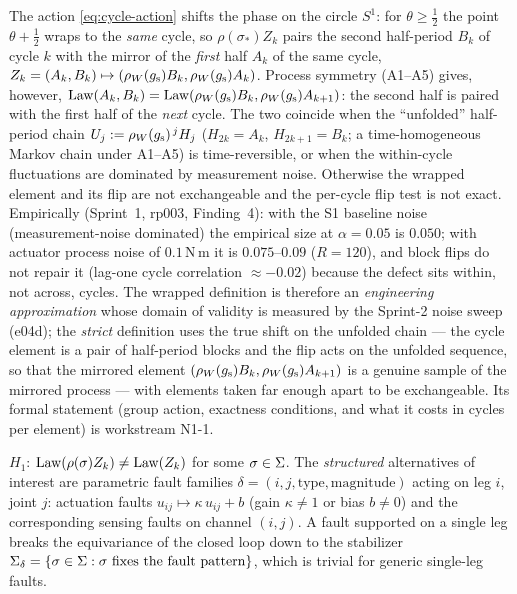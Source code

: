 \begin{remark}
\label{rem:wrap}
The action \eqref{eq:cycle-action} shifts the phase on the circle $S^1$: for
$\theta \ge \tfrac12$ the point $\theta + \tfrac12$ wraps to the \emph{same}
cycle, so $\rho(\sigma_*) Z_k$ pairs the second half-period $B_k$ of cycle $k$
with the mirror of the \emph{first} half $A_k$ of the same cycle,
$Z_k = (A_k, B_k) \mapsto (\rho_{W}(g_{\mathrm{s}}) B_k, \rho_{W}(g_{\mathrm{s}}) A_k)$. Process symmetry
(A1--A5) gives, however, $\operatorname{Law}(A_k, B_k) = \operatorname{Law}(\rho_{W}(g_{\mathrm{s}}) B_k, \rho_{W}(g_{\mathrm{s}})
A_{k+1})$: the second half is paired with the first half of the \emph{next}
cycle. The two coincide when the ``unfolded'' half-period chain
$U_j := \rho_{W}(g_{\mathrm{s}})^{\,j} H_j$ ($H_{2k} = A_k$, $H_{2k+1} = B_k$; a
time-homogeneous Markov chain under A1--A5) is time-reversible, or when the
within-cycle fluctuations are dominated by measurement noise. Otherwise the
wrapped element and its flip are not exchangeable and the per-cycle flip test
is not exact. Empirically (Sprint~1, rp003, Finding~4): with the S1 baseline
noise (measurement-noise dominated) the empirical size at $\alpha = 0.05$ is
$0.050$; with actuator process noise of $0.1$\,N\,m it is $0.075$--$0.09$
($R = 120$), and block flips do not repair it (lag-one cycle correlation
$\approx -0.02$) because the defect sits within, not across, cycles. The
wrapped definition is therefore an \emph{engineering approximation} whose
domain of validity is measured by the Sprint-2 noise sweep (e04d); the
\emph{strict} definition uses the true shift on the unfolded chain --- the
cycle element is a pair of half-period blocks and the flip acts on the
unfolded sequence, so that the mirrored element $(\rho_{W}(g_{\mathrm{s}}) B_k, \rho_{W}(g_{\mathrm{s}})
A_{k+1})$ is a genuine sample of the mirrored process --- with elements
taken far enough apart to be exchangeable. Its formal statement (group
action, exactness conditions, and what it costs in cycles per element) is
workstream N1-1.
\end{remark}

\begin{definition}[Alternative $H_1$]
\label{def:h1}
$H_1$: $\operatorname{Law}(\rho(\sigma) Z_k) \neq \operatorname{Law}(Z_k)$ for some
$\sigma \in \Sigma$. The \emph{structured} alternatives of interest are
parametric fault families $\delta = (i, j, \text{type}, \text{magnitude})$
acting on leg $i$, joint $j$: actuation faults
$u_{ij} \mapsto \kappa\, u_{ij} + b$ (gain $\kappa \neq 1$ or bias
$b \neq 0$) and the corresponding sensing faults on channel $(i,j)$. A fault
supported on a single leg breaks the equivariance of the closed loop down to
the stabilizer $\Sigma_\delta = \{\sigma \in \Sigma : \sigma \text{ fixes
the fault pattern}\}$, which is trivial for generic single-leg faults.
\end{definition}


